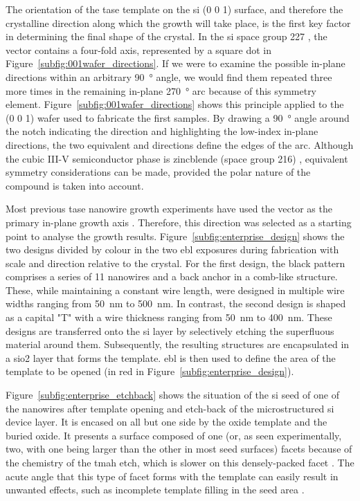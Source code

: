 The orientation of the \acs{tase} template on the \acl{si} \hkl(0 0 1) surface, and therefore the crystalline direction along which the growth will take place, is the first key factor in determining the final shape of the crystal. In the \acl{si} space group \num{227} \cite{osti_si}, the  vector contains a four-fold axis, represented by a square dot in Figure~\ref{subfig:001wafer_directions}. If we were to examine the possible in-plane directions within an arbitrary \qty{90}{\degree} angle, we would find them repeated three more times in the remaining in-plane \qty{270}{\degree} arc because of this symmetry element. Figure~\ref{subfig:001wafer_directions} shows this principle applied to the \hkl(0 0 1) wafer used to fabricate the first samples. By drawing a \qty{90}{\degree} angle around the notch indicating the \hkl[1 1 0] direction and highlighting the low-index in-plane directions, the two equivalent \hkl[0 1 0] and \hkl[1 0 0] directions define the edges of the arc. Although the cubic III-V semiconductor phase is zincblende (space group \num{216}) \cite{wyckoff1963crystal, osti_gaas_zb, osti_inas_zb, osti_inp_zb}, equivalent symmetry considerations can be made, provided the polar nature of the compound is taken into account.
\par
Most previous \acs{tase} nanowire growth experiments have used the  vector as the primary in-plane growth axis \cite{Brunelli2019, Knoedler2017, Borg2017, Schmid2015}. Therefore, this direction was selected as a starting point to analyse the growth results. Figure~\ref{subfig:enterprise_design} shows the two designs divided by colour in the two \acf{ebl} exposures during fabrication with scale and direction relative to the crystal. For the first design, the black pattern comprises a series of \num{11} nanowires and a back anchor in a comb-like structure. These, while maintaining a constant wire length, were designed in multiple wire widths ranging from \qty{50}{\nano\metre} to \qty{500}{\nano\metre}. In contrast, the second design is shaped as a capital "T" with a wire thickness ranging from \qty{50}{\nano\metre} to \qty{400}{\nano\metre}. These designs are transferred onto the \acl{si} layer by selectively etching the superfluous material around them. Subsequently, the resulting structures are encapsulated in a \acs{sio2} layer that forms the template. \acs{ebl} is then used to define the area of the template to be opened (in red in Figure~\ref{subfig:enterprise_design}).
\par
Figure~\ref{subfig:enterprise_etchback} shows the situation of the \acl{si} seed of one of the nanowires after template opening and etch-back of the microstructured \acl{si} device layer. It is encased on all but one side by the oxide template and the buried oxide. It presents a surface composed of one (or, as seen experimentally, two, with one being larger than the other in most seed surfaces)  facets because of the chemistry of the \acs{tmah} etch, which is slower on this densely-packed facet \cite{Zubel2012}. The acute angle that this type of facet forms with the template can easily result in unwanted effects, such as incomplete template filling in the seed area \cite{Scherrer2022}. 

